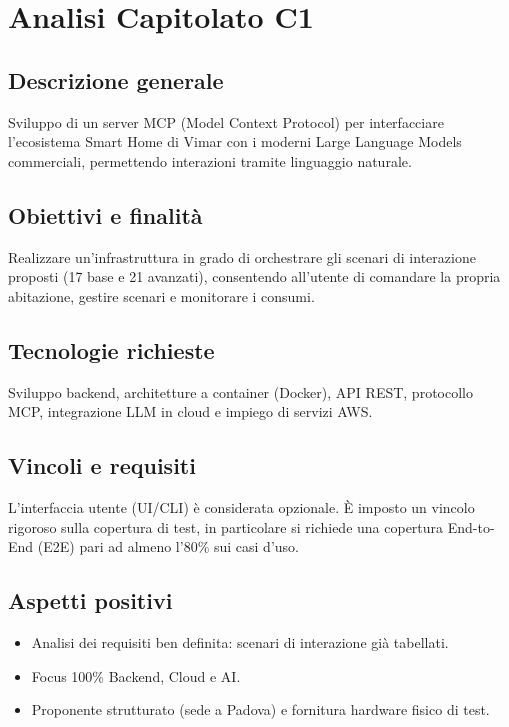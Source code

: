 \documentclass[a4paper, 11pt]{article}
\begin{document}
\section{Analisi Capitolato C1}

\subsection{Descrizione generale}
Sviluppo di un server MCP (Model Context Protocol) per interfacciare l'ecosistema Smart Home di Vimar con i moderni Large Language Models commerciali, permettendo interazioni tramite linguaggio naturale.

\subsection{Obiettivi e finalità}
Realizzare un'infrastruttura in grado di orchestrare gli scenari di interazione proposti (17 base e 21 avanzati), consentendo all'utente di comandare la propria abitazione, gestire scenari e monitorare i consumi.

\subsection{Tecnologie richieste}
Sviluppo backend, architetture a container (Docker), API REST, protocollo MCP, integrazione LLM in cloud e impiego di servizi AWS.

\subsection{Vincoli e requisiti}
L'interfaccia utente (UI/CLI) è considerata opzionale. È imposto un vincolo rigoroso sulla copertura di test, in particolare si richiede una copertura End-to-End (E2E) pari ad almeno l'80\% sui casi d'uso.

\subsection{Aspetti positivi}
\begin{itemize}[label=-]
    \item Analisi dei requisiti ben definita: scenari di interazione già tabellati.
    \item Focus 100\% Backend, Cloud e AI.
    \item Proponente strutturato (sede a Padova) e fornitura hardware fisico di test.
\end{itemize}
\end{document}
